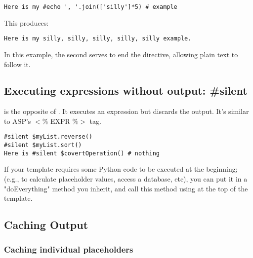 
\begin{verbatim}
Here is my #echo ', '.join(['silly']*5) # example 
\end{verbatim}

This produces:

\begin{verbatim}
Here is my silly, silly, silly, silly, silly example.
\end{verbatim}

In this example, the second \code{\#} serves to end the  directive,
allowing plain text to follow it.

\subsection{Executing expressions without output: \#silent}
\label{output.silent}

 is the opposite of .  It executes an expression
but discards the output.  It's similar to ASP's $<$\% EXPR \%$>$ tag.

\begin{verbatim}
#silent $myList.reverse()
#silent $myList.sort()
Here is #silent $covertOperation() # nothing
\end{verbatim}

If your template requires some Python code to be executed at the beginning;
(e.g., to calculate placeholder values, access a database, etc), you can put
it in a "doEverything" method you inherit, and call this method using
 at the top of the template.

\subsection{Caching Output}
\label{output.caching}

\subsubsection{Caching individual placeholders}
\label{output.caching.placeholders}

